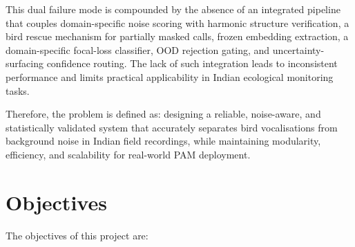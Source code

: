 \documentclass[a4paper,12pt]{article}
\begin{document}
\vspace{0.3cm}

\noindent
This dual failure mode is compounded by the absence of an integrated pipeline that couples domain-specific
noise scoring with harmonic structure verification, a bird rescue mechanism for partially masked calls,
frozen embedding extraction, a domain-specific focal-loss classifier, OOD rejection gating, and
uncertainty-surfacing confidence routing. The lack of such integration leads to inconsistent performance
and limits practical applicability in Indian ecological monitoring tasks.

\vspace{0.3cm}

\noindent
Therefore, the problem is defined as: designing a reliable, noise-aware, and statistically validated
system that accurately separates bird vocalisations from background noise in Indian field recordings,
while maintaining modularity, efficiency, and scalability for real-world PAM deployment.
\newpage
\section{Objectives}

\noindent
The objectives of this project are:
\end{document}
